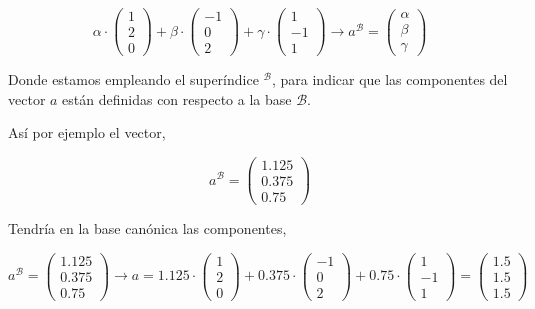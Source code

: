 \begin{equation*}
\alpha \cdot \begin{pmatrix}
1\\
2\\
0
\end{pmatrix}+\beta \cdot \begin{pmatrix}
-1\\
0\\
2
\end{pmatrix}+ \gamma \cdot \begin{pmatrix}
1\\
-1\\
1
\end{pmatrix} \rightarrow a^{\mathcal{B}}=\begin{pmatrix}
\alpha \\
\beta \\
\gamma
\end{pmatrix}
\end{equation*} 
\begin{paracol}{2}
Donde  estamos empleando el superíndice $^{\mathcal{B}}$, para indicar que las componentes del vector $a$ están definidas con respecto a la base $\mathcal{B}$.

Así por ejemplo el vector,
\end{paracol} 
\begin{equation*}
a^{\mathcal{B}}=\begin{pmatrix}
1.125\\
0.375\\
0.75
\end{pmatrix}
\end{equation*}
\begin{paracol}{2}
Tendría en la base canónica las componentes,
\end{paracol}
\begin{equation*}
a^{\mathcal{B}}=\begin{pmatrix}
1.125\\
0.375\\
0.75
\end{pmatrix} \rightarrow a= 1.125 \cdot \begin{pmatrix}
1\\
2\\
0
\end{pmatrix}+0.375 \cdot \begin{pmatrix}
-1\\
0\\
2
\end{pmatrix}+ 0.75 \cdot \begin{pmatrix}
1\\
-1\\
1
\end{pmatrix} =\begin{pmatrix}
1.5\\
1.5 \\
1.5
\end{pmatrix}
\end{equation*}

